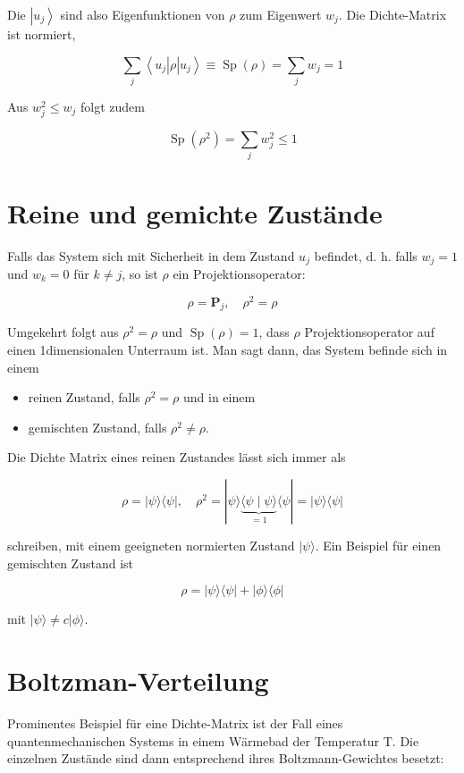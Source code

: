 \documentclass[10pt, letterpaper]{article}
\begin{document}
Die $\left|u_{j}\right\rangle$ sind also Eigenfunktionen von $\rho$ zum Eigenwert $w_{j}$. Die Dichte-Matrix ist normiert,

$$
\sum_{j}\left\langle u_{j}\right| \rho\left|u_{j}\right\rangle \equiv \operatorname{Sp}(\rho)=\sum_{j} w_{j}=1
$$

Aus $w_{j}^{2} \leq w_{j}$ folgt zudem

$$
\operatorname{Sp}\left(\rho^{2}\right)=\sum_{j} w_{j}^{2} \leq 1
$$

\section*{Reine und gemichte Zustände}
Falls das System sich mit Sicherheit in dem Zustand $u_{j}$ befindet, d. h. falls $w_{j}=1$ und $w_{k}=0$ für $k \neq j$, so ist $\rho$ ein Projektionsoperator:

$$
\rho=\mathbf{P}_{j}, \quad \rho^{2}=\rho
$$

Umgekehrt folgt aus $\rho^{2}=\rho$ und $\operatorname{Sp}(\rho)=1$, dass $\rho$ Projektionsoperator auf einen 1dimensionalen Unterraum ist. Man sagt dann, das System befinde sich in einem

\begin{itemize}
  \item reinen Zustand, falls $\rho^{2}=\rho$ und in einem
  \item gemischten Zustand, falls $\rho^{2} \neq \rho$.
\end{itemize}

Die Dichte Matrix eines reinen Zustandes lässt sich immer als

$$
\rho=|\psi\rangle\langle\psi|, \quad \rho^{2}=|\psi\rangle \underbrace{\langle\psi \mid \psi\rangle}_{=1}\langle\psi|=|\psi\rangle\langle\psi|
$$

schreiben, mit einem geeigneten normierten Zustand $|\psi\rangle$. Ein Beispiel für einen gemischten Zustand ist

$$
\rho=|\psi\rangle\langle\psi|+|\phi\rangle\langle\phi|
$$

mit $|\psi\rangle \neq c|\phi\rangle$.

\section*{Boltzman-Verteilung}
Prominentes Beispiel für eine Dichte-Matrix ist der Fall eines quantenmechanischen Systems in einem Wärmebad der Temperatur T. Die einzelnen Zustände sind dann entsprechend ihres Boltzmann-Gewichtes besetzt:
\end{document}
